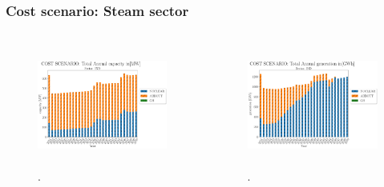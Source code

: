 \begin{frame}
  \frametitle{Cost scenario: Steam sector}
  \begin{columns}
	  \column[t]{5cm}
  		\begin{figure}[htbp!]
    			\begin{center}
            \includegraphics[height=4cm]{./images/cost scenario_ind_capacity.png}
          \end{center}
          \caption{.}
          \label{fig:cost-stm-cap}
      \end{figure}
    \column[t]{5cm}
        \begin{figure}[htbp!]
          \begin{center}
            \includegraphics[height=4cm]{./images/cost scenario_ind_generation.png}
          \end{center}
          \caption{.}
          \label{fig:cost-stm-gen}
        \end{figure}
    \end{columns}
\end{frame}
